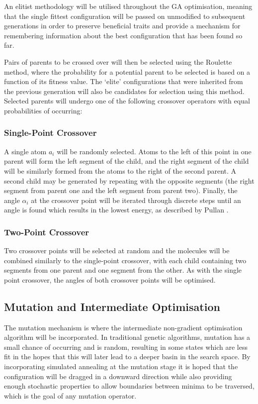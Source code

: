 \documentclass{article}
\begin{document}
An elitist methodology will be utilised throughout the GA optimisation, meaning
that the single fittest configuration will be passed on unmodified to subsequent
generations in order to preserve beneficial traits and provide a mechanism for
remembering information about the best configuration that has been found so far.

Pairs of parents to be crossed over will then be selected using the Roulette
method, where the probability for a potential parent to be selected is based on
a function of its fitness value. The `elite' configurations that were inherited
from the previous generation will also be candidates for selection using this
method. Selected parents will undergo one of the following crossover operators
with equal probabilities of occurring:

\subsubsection{Single-Point Crossover}

A single atom $a_i$ will be randomly selected. Atoms to the left of this point
in one parent will form the left segment of the child, and the right segment of
the child will be similarly formed from the atoms to the right of the second
parent. A second child may be generated by repeating with the opposite segments
(the right segment from parent one and the left segment from parent two).
Finally, the angle $\alpha_i$ at the crossover point will be iterated through
discrete steps until an angle is found which results in the lowest energy, as
described by Pullan \cite{PULLAN1998331}.

\subsubsection{Two-Point Crossover}

Two crossover points will be selected at random and the molecules will be
combined similarly to the single-point crossover, with each child containing two
segments from one parent and one segment from the other. As with the single
point crossover, the angles of both crossover points will be optimised.

\subsection{Mutation and Intermediate Optimisation}

The mutation mechanism is where the intermediate non-gradient optimisation
algorithm will be incorporated. In traditional genetic algorithms, mutation has
a small chance of occurring and is random, resulting in some states which are
less fit in the hopes that this will later lead to a deeper basin in the search
space. By incorporating simulated annealing at the mutation stage it is hoped
that the configuration will be dragged in a downward direction while also
providing enough stochastic properties to allow boundaries between minima to be
traversed, which is the goal of any mutation operator.
\end{document}
